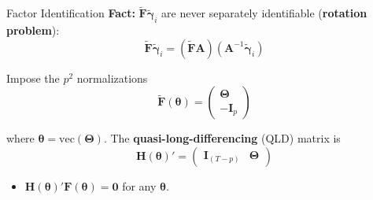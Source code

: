 \documentclass{beamer}
\newcommand{\1}{\mathds{1}} %
\begin{document}
\begin{frame}{Factor Identification}
    \textbf{Fact:} $\tilde{\bm F} \tilde{\bm \gamma}_i$ are never separately identifiable (\textbf{rotation problem}):
    \begin{equation*}
        \tilde{\bm F} \tilde{\bm \gamma}_i = (\tilde{\bm F}\bm A) (\bm A^{-1} \tilde{\bm \gamma}_i)
    \end{equation*} 

    \vspace{.25cm}

    Impose the $p^2$ normalizations
    \begin{equation*}
        \tilde{\bm F}(\bm \theta) = 
    \begin{pmatrix}
        \bm \Theta\\
        - \bm I_p
    \end{pmatrix}
    \end{equation*}

    where $\bm \theta = \text{vec}(\bm \Theta)$. The \textbf{quasi-long-differencing} (QLD) matrix is
    \begin{equation*}
        \bm H(\bm \theta)' = 
    \begin{pmatrix}
        \bm I_{(T-p)} & \bm \Theta
    \end{pmatrix}
    \end{equation*}
    \begin{itemize}
        \item $\bm H(\bm \theta)' \bm F(\bm \theta) = \bm 0$ for any $\bm \theta$. 
    \end{itemize}


    
\end{frame}

\end{document}
